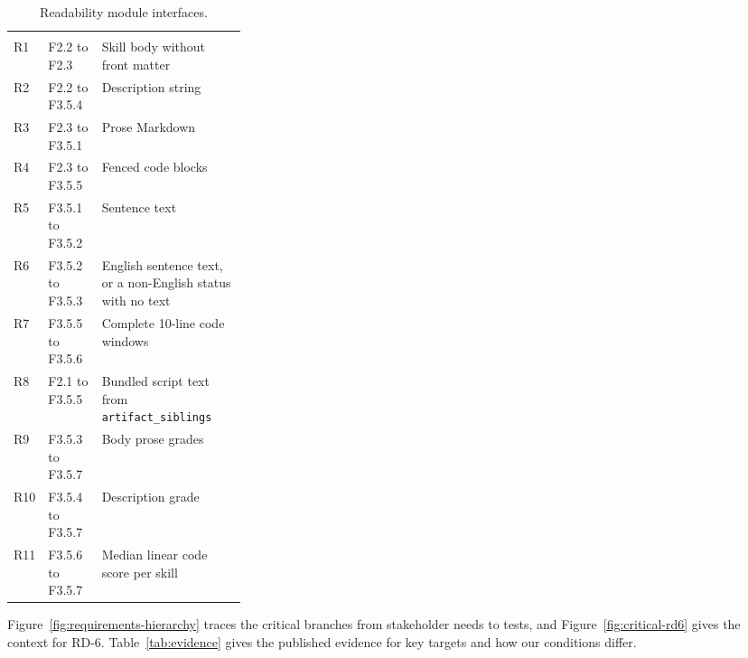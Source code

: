 \begin{singlespace}
\setlength{\LTcapwidth}{\linewidth}
\begin{longtable}{@{}L{0.07\linewidth} L{0.23\linewidth} L{\tabcolsep\relax}@{}}
\caption{Readability module interfaces.}\label{tab:readability-interfaces}\\
 &  & \\
\midrule
\endfirsthead
{}
 &  & \\
\midrule
\endhead
\bottomrule
\endfoot
R1 & F2.2 to F2.3 & Skill body without front matter\\
R2 & F2.2 to F3.5.4 & Description string\\
R3 & F2.3 to F3.5.1 & Prose Markdown\\
R4 & F2.3 to F3.5.5 & Fenced code blocks\\
R5 & F3.5.1 to F3.5.2 & Sentence text\\
R6 & F3.5.2 to F3.5.3 & English sentence text, or a non-English status with no text\\
R7 & F3.5.5 to F3.5.6 & Complete 10-line code windows\\
R8 & F2.1 to F3.5.5 & Bundled script text from \texttt{artifact\_siblings}\\
R9 & F3.5.3 to F3.5.7 & Body prose grades\\
R10 & F3.5.4 to F3.5.7 & Description grade\\
R11 & F3.5.6 to F3.5.7 & Median linear code score per skill\\
\end{longtable}
\end{singlespace}

\clearpage
{}\label{app:requirements}

Figure~\ref{fig:requirements-hierarchy} traces the critical branches from stakeholder needs to tests, and Figure~\ref{fig:critical-rd6} gives the context for RD-6. Table~\ref{tab:evidence} gives the published evidence for key targets and how our conditions differ.


